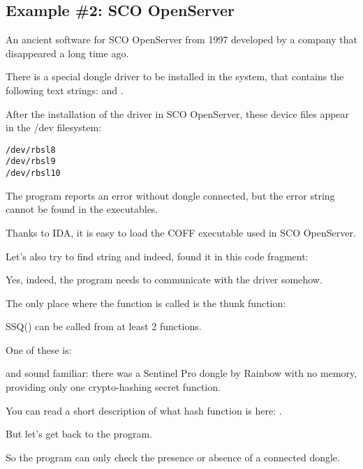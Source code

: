 \subsection{Example \#2: SCO OpenServer}

\label{examples_SCO}
An ancient software for SCO OpenServer from 1997 
developed
by a company that disappeared a long time ago.


There is a special dongle driver to be installed in the system, that contains the following text strings:
and
.

After the installation of the driver in SCO OpenServer, these device files appear in the /dev filesystem:

\begin{lstlisting}
/dev/rbsl8
/dev/rbsl9
/dev/rbsl10
\end{lstlisting}

The program reports an error without dongle connected, but the error string cannot be found in the executables.


Thanks to \ac{IDA}, it is easy to load the COFF executable used in SCO OpenServer.

Let's also try to find  string and indeed, found it in this code fragment:



Yes, indeed, the program needs to communicate with the driver somehow.

The only place where the 
function is called is the \gls{thunk function}:



SSQ() can be called from at least 2 functions.

One of these is:



 and  sound familiar: there was a Sentinel Pro dongle by Rainbow with no memory,
providing only one crypto-hashing secret function.

You can read a short description
of what hash function is here: .

But let's get back to the program.

So the program can only check the presence or absence of a connected dongle.

